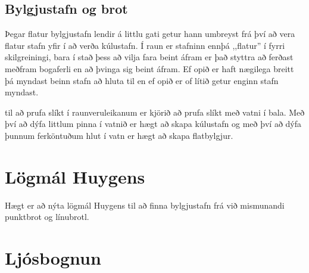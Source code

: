 \subsection{Bylgjustafn og brot}
Þegar flatur bylgjustafn lendir á littlu gati getur hann umbreyst frá því
að vera flatur stafn yfir í að verða kúlustafn. Í raun er stafninn ennþá
,,flatur'' í fyrri skilgreiningi, bara í stað þess að vilja fara beint
áfram er það styttra að ferðast meðfram bogaferli en að þvinga sig beint
áfram. Ef opið er haft nægilega breitt þá myndast beinn stafn að hluta
til en ef opið er of lítið getur enginn stafn myndast.
\begin{center}
\end{center}
til að prufa slíkt í raunveruleikanum er kjörið að prufa slíkt með vatni
í bala. Með því að dýfa littlum pinna í vatnið er hægt að skapa
kúlustafn og með því að dýfa þunnum ferköntuðum hlut í vatn er hægt að
skapa flatbylgjur.

\section{Lögmál Huygens}
Hægt er að nýta lögmál Huygens til að finna bylgjustafn frá við mismunandi
punktbrot og línubrotl.

\section{Ljósbognun}

